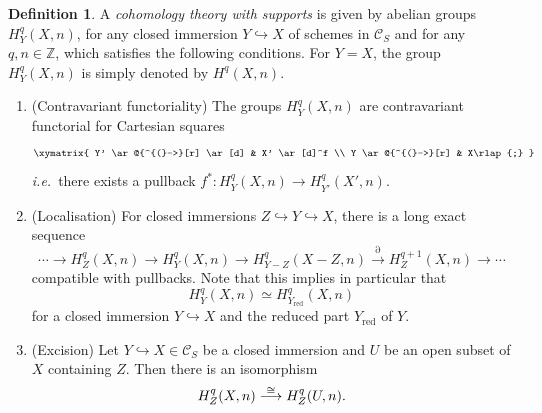 \documentclass[11pt]{amsart}
\numberwithin{equation}{section}
\newtheorem{Key lemma}[theorem]{Key lemma}
\theoremstyle{definition}
\newtheorem{definition}[theorem]{Definition}
\theoremstyle{remark}
\newcommand{\bb}{\mathbb}
\newcommand{\To}{\longrightarrow}
\newcommand{\cal}{\mathcal}
\newcommand{\xTo}[1]{\stackrel{#1}{\To}}
\newcommand{\red}{\mathrm{red}}
\def\lowcong{\vbox to 0pt{\vss\hbox{$\scriptstyle\cong$}\vskip-1.2pt}}
\begin{document}
\begin{definition}\label{def.HTD}
A \textit{cohomology theory with supports} is given by abelian groups $H^q_Y(X,n)$, for any closed immersion $Y\hookrightarrow X$ of schemes in $\cal C_S$ and for any $q,n\in \bb Z$,
which satisfies the following conditions. For $Y=X$, the group $H^q_Y(X,n)$ is simply denoted by
$H^q(X,n)$. 
\begin{enumerate}
\item (Contravariant functoriality) The groups $H^q_Y(X,n)$ are contravariant functorial for Cartesian squares
\[
\xymatrix{
Y' \ar@{^{(}->}[r] \ar[d] & X' \ar[d]^f \\
Y \ar@{^{(}->}[r]  & X\rlap{;}
}
\]
\textit{i.e.}~there exists a pullback $f^*\colon H^q_Y(X,n) \to H^q_{Y'}(X',n)$.

\item\label{def.HTD-2} (Localisation)\label{pullback.locseq} For closed immersions $Z\hookrightarrow Y\hookrightarrow X$, there is a long exact sequence 
\[
\cdots \To H^q_Z(X,n) \To H^q_Y(X,n) \To H^q_{Y-Z}(X-Z,n) \stackrel{\partial}{\To} H^{q+1}_Z(X,n)\To \cdots
\]
compatible with pullbacks. Note that this implies in particular that
\[
H^q_Y(X,n) \simeq H^q_{Y_{\red}}(X,n)
\]
for a closed immersion $Y\hookrightarrow X$ and the reduced part $Y_{\red}$ of $Y$.

\item\label{def.HTD-3} (Excision) Let $Y\hookrightarrow X\in \cal C_S$ be a closed immersion and $U$ be an open subset of $X$ containing $Z$. Then there is an isomorphism 
  $$
  H^q_Z(X,n)\xTo{\lowcong}H^q_Z(U,n).
  $$
\end{enumerate}
\end{definition}
\end{document}
